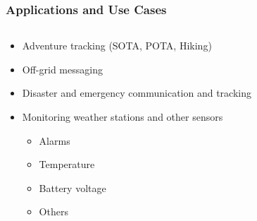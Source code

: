 \documentclass[aspectratio=169]{beamer}
\begin{document}
\begin{frame}[t]
  \frametitle{Applications and Use Cases}
  \begin{columns}
    \begin{column}{0.66\textwidth}
      \begin{itemize}
        \item Adventure tracking (SOTA, POTA, Hiking)
        \medskip
        \item Off-grid messaging
        \medskip
        \item Disaster and emergency communication and tracking
        \medskip
        \item Monitoring weather stations and other sensors
        \medskip
        \begin{itemize}
          \item Alarms
          \medskip
          \item Temperature
          \medskip
          \item Battery voltage
          \medskip
          \item Others
        \end{itemize}
      \end{itemize}
      \end{column}
      \begin{column}{0.33\textwidth}
      \end{column}
    \end{columns}
  \end{frame}
\end{document}
